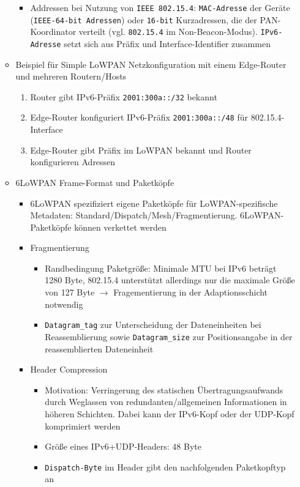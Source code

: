 \begin{itemize}
\begin{itemize}
\begin{itemize}
\begin{itemize}
			\end{itemize}
			\item Addressen bei Nutzung von \texttt{IEEE 802.15.4}: \texttt{MAC-Adresse} der Geräte (\texttt{IEEE-64-bit Adressen}) oder \texttt{16-bit} Kurzadressen, die der PAN-Koordinator verteilt (vgl. \texttt{802.15.4} im Non-Beacon-Modus). \texttt{IPv6-Adresse} setzt sich aus Präfix und Interface-Identifier zusammen
		\end{itemize}
		\item Beispiel für Simple LoWPAN Netzkonfiguration mit einem Edge-Router und mehreren Routern/Hosts
		\begin{enumerate}
			\item Router gibt IPv6-Präfix \texttt{2001:300a::/32} bekannt
			\item Edge-Router konfiguriert IPv6-Präfix \texttt{2001:300a::/48} für 802.15.4-Interface
			\item Edge-Router gibt Präfix im LoWPAN bekannt und Router konfigurieren Adressen
		\end{enumerate}
		\item 6LoWPAN Frame-Format und Paketköpfe
		\begin{itemize}
			\item 6LoWPAN spezifiziert eigene Paketköpfe für LoWPAN-spezifische Metadaten: Standard/Dispatch/Mesh/Fragmentierung. 6LoWPAN-Paketköpfe können verkettet werden
			\item Fragmentierung
			\begin{itemize}
				\item Randbedingung Paketgröße: Minimale MTU bei IPv6 beträgt 1280 Byte, 802.15.4 unterstützt allerdings nur die maximale Größe von 127 Byte \(\rightarrow\) Fragementierung in der Adaptionsschicht notwendig
				\item \texttt{Datagram\_tag} zur Unterscheidung der Dateneinheiten bei Reassemblierung sowie \texttt{Datagram\_size} zur Positionsangabe in der reassemblierten Dateneinheit
			\end{itemize}
			\item Header Compression
			\begin{itemize}
				\item Motivation: Verringerung des statischen Übertragungsaufwands durch Weglassen von redundanten/allgemeinen Informationen in höheren Schichten. Dabei kann der IPv6-Kopf oder der UDP-Kopf komprimiert werden
				\item Größe eines IPv6+UDP-Headers: 48 Byte
				\item \texttt{Dispatch-Byte} im Header gibt den nachfolgenden Paketkopftyp an

\end{itemize}
\end{itemize}
\end{itemize}
\end{itemize}
